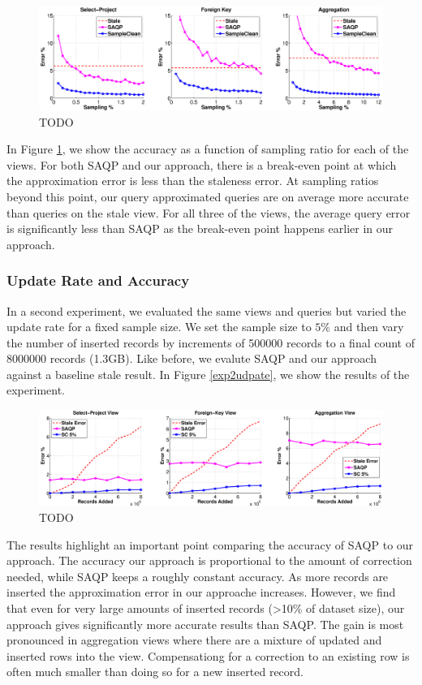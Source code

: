 \begin{figure}[ht!]
\label{exp1sample}
\centering
 \includegraphics[width=\textwidth]{exp/exp1-samplesize-accuracy.eps}
 \caption{TODO}
\end{figure}

In Figure \ref{exp1sample}, we show the accuracy as a function of sampling ratio for each of the views.
For both SAQP and our approach, there is a break-even point at which the approximation error is less than the staleness error.
At sampling ratios beyond this point, our query approximated queries are on average more accurate than queries on the stale view.
For all three of the views, the average query error is significantly less than SAQP as the break-even point happens earlier in our approach.

\subsubsection{Update Rate and Accuracy}
In a second experiment, we evaluated the same views and queries but varied the update rate for a fixed sample size.
We set the sample size to $5\%$ and then vary the number of inserted records by increments of 500000 records to a final count of 8000000 records (1.3GB).
Like before, we evalute SAQP and our approach against a baseline stale result.
In Figure \ref{exp2udpate}, we show the results of the experiment. 

\begin{figure}[ht!]
\label{exp2update}
\centering
 \includegraphics[width=\textwidth]{exp/exp2-updatesize-accuracy.eps}
 \caption{TODO}
\end{figure}

The results highlight an important point comparing the accuracy of SAQP to our approach. 
The accuracy our approach is proportional to the amount of correction needed, while SAQP keeps a roughly constant accuracy.
As more records are inserted the approximation error in our approache increases.
However, we find that even for very large amounts of inserted records (>10\% of dataset size), our approach gives significantly more accurate results
than SAQP.
The gain is most pronounced in aggregation views where there are a mixture of updated and inserted rows into the view.
Compensationg for a correction to an existing row is often much smaller than doing so for a new inserted record.

